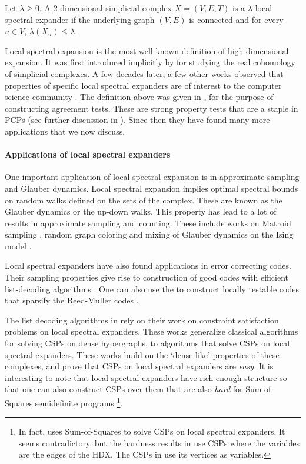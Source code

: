 \begin{definition}
    Let \(\lambda \geq 0\). A \(2\)-dimensional simplicial complex \(X=(V,E,T)\) is a \(\lambda\)-local spectral expander if the underlying graph $(V,E)$ is connected and for every \(u \in V\), \(\lambda(X_u) \leq \lambda\). 
\end{definition}
Local spectral expansion is the most well known definition of high dimensional expansion. It was first introduced implicitly by \cite{Garland1973} for studying the real cohomology of simplicial complexes. A few decades later, a few other works observed that properties of specific local spectral expanders are of interest to the computer science community \cite{LubotzkySV2005,KaufmanKL2016,KaufmanM2017}. The definition above was given in \cite{DinurK2017}, for the purpose of constructing agreement tests. These are strong property tests that are a staple in PCPs (see further discussion in ). Since then they have found many more applications that we now discuss.

\paragraph{Applications of local spectral expanders} One important application of local spectral expansion is in approximate sampling and Glauber dynamics. Local spectral expansion implies optimal spectral bounds on random walks defined on the sets of the complex. These are known as the Glauber dynamics or the up-down walks. This property has lead to a lot of results in approximate sampling and counting. These include works on Matroid sampling \cite{AnariLOV2019}, random graph coloring \cite{chen2021rapid} and mixing of Glauber dynamics on the Ising model \cite{AnariJKPV2021}. 

Local spectral expanders have also found applications in error correcting codes. Their sampling properties give rise to construction of good codes with efficient list-decoding algorithms \cite{AlevJT2019,DinurHKLT2021,jeronimo2021near}. One can also use the to construct locally testable codes that sparsify the Reed-Muller codes \cite{DinurLZ2023}.

The list decoding algorithms in \cite{AlevJT2019,jeronimo2021near} rely on their work on constraint satisfaction problems on local spectral expanders. These works generalize classical algorithms for solving CSPs on dense hypergraphs, to algorithms that solve CSPs on local spectral expanders. These works build on the `dense-like' properties of these complexes, and prove that CSPs on local spectral expanders are \emph{easy}. It is interesting to note that local spectral expanders have rich enough structure so that one can also construct CSPs over them that are also \emph{hard} for Sum-of-Squares semidefinite programs \cite{DinurFHT2020,HopkinsL2022}\footnote{In fact, \cite{AlevJT2019} uses Sum-of-Squares to solve CSPs on local spectral expanders. It seems contradictory, but the hardness results in \cite{DinurFHT2020,HopkinsL2022} use CSPs where the variables are the edges of the HDX. The CSPs in \cite{AlevJT2019} use its vertices as variables.}.

